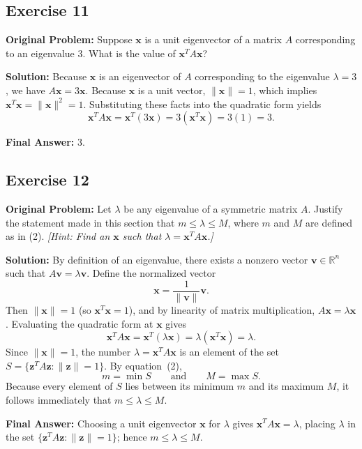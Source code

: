 \documentclass[11pt, letterpaper]{article}
\theoremstyle{definition}
\theoremstyle{remark}
\newcommand{\R}{\mathbb{R}}
\begin{document}
\subsection{Exercise 11}
\textbf{Original Problem:} Suppose $\mathbf{x}$ is a unit eigenvector of a matrix $A$ corresponding to an eigenvalue $3$. What is the value of $\mathbf{x}^T A \mathbf{x}$?

\textbf{Solution:}
Because $\mathbf{x}$ is an eigenvector of $A$ corresponding to the eigenvalue $\lambda = 3$, we have $A\mathbf{x} = 3\mathbf{x}$. Because $\mathbf{x}$ is a unit vector, $\|\mathbf{x}\| = 1$, which implies $\mathbf{x}^T \mathbf{x} = \|\mathbf{x}\|^2 = 1$. Substituting these facts into the quadratic form yields
\[
\mathbf{x}^T A \mathbf{x} = \mathbf{x}^T (3\mathbf{x}) = 3(\mathbf{x}^T \mathbf{x}) = 3(1) = 3.
\]

\textbf{Final Answer:} $3$.

\subsection{Exercise 12}
\textbf{Original Problem:} Let $\lambda$ be any eigenvalue of a symmetric matrix $A$. Justify the statement made in this section that $m \le \lambda \le M$, where $m$ and $M$ are defined as in (2). \emph{[Hint: Find an $\mathbf{x}$ such that $\lambda = \mathbf{x}^T A \mathbf{x}$.]}

\textbf{Solution:}
By definition of an eigenvalue, there exists a nonzero vector $\mathbf{v} \in \R^n$ such that $A\mathbf{v} = \lambda \mathbf{v}$. Define the normalized vector
\[
\mathbf{x} = \frac{1}{\|\mathbf{v}\|}\mathbf{v}.
\]
Then $\|\mathbf{x}\| = 1$ (so $\mathbf{x}^T \mathbf{x} = 1$), and by linearity of matrix multiplication, $A\mathbf{x} = \lambda \mathbf{x}$. Evaluating the quadratic form at $\mathbf{x}$ gives
\[
\mathbf{x}^T A \mathbf{x} = \mathbf{x}^T (\lambda \mathbf{x}) = \lambda (\mathbf{x}^T \mathbf{x}) = \lambda.
\]
Since $\|\mathbf{x}\| = 1$, the number $\lambda = \mathbf{x}^T A \mathbf{x}$ is an element of the set $S = \{\mathbf{z}^T A \mathbf{z} : \|\mathbf{z}\| = 1\}$. By equation~(2),
\[
m = \min S \qquad \text{and} \qquad M = \max S.
\]
Because every element of $S$ lies between its minimum $m$ and its maximum $M$, it follows immediately that $m \le \lambda \le M$.

\textbf{Final Answer:} Choosing a unit eigenvector $\mathbf{x}$ for $\lambda$ gives $\mathbf{x}^T A \mathbf{x} = \lambda$, placing $\lambda$ in the set $\{\mathbf{z}^T A \mathbf{z} : \|\mathbf{z}\| = 1\}$; hence $m \le \lambda \le M$.
\end{document}
